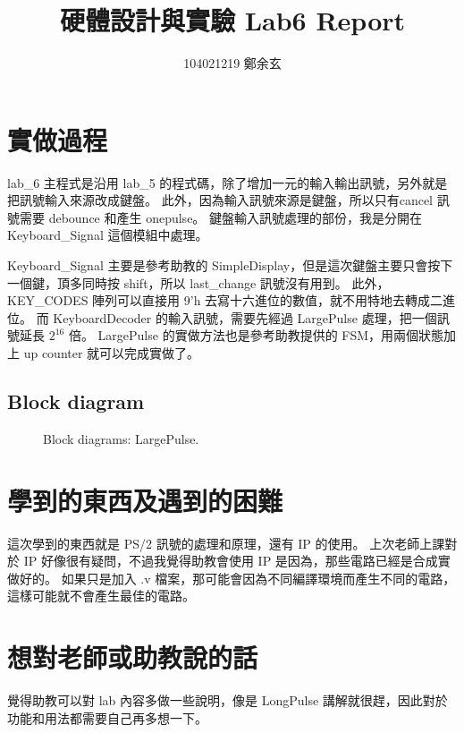 \documentclass{article}
\begin{document}
\begin{CJK}{UTF8}{bsmi}
\title{硬體設計與實驗 Lab6 Report}
\author{104021219 鄭余玄}
\date{}
\maketitle
\section{實做過程}
lab\_6 主程式是沿用 lab\_5 的程式碼，除了增加一元的輸入輸出訊號，另外就是把訊號輸入來源改成鍵盤。
此外，因為輸入訊號來源是鍵盤，所以只有cancel 訊號需要 debounce 和產生 onepulse。
鍵盤輸入訊號處理的部份，我是分開在 Keyboard\_Signal 這個模組中處理。

Keyboard\_Signal 主要是參考助教的 SimpleDisplay，但是這次鍵盤主要只會按下一個鍵，頂多同時按 shift，所以 last\_change 訊號沒有用到。
此外，KEY\_CODES 陣列可以直接用 9'h 去寫十六進位的數值，就不用特地去轉成二進位。
而 KeyboardDecoder 的輸入訊號，需要先經過 LargePulse 處理，把一個訊號延長 $2^{16}$ 倍。
LargePulse 的實做方法也是參考助教提供的 FSM，用兩個狀態加上 up counter 就可以完成實做了。

\subsection{Block diagram}
\begin{figure}[h]
\caption{Block diagrams: LargePulse.}
\end{figure}

\section{學到的東西及遇到的困難}
這次學到的東西就是 PS/2 訊號的處理和原理，還有 IP 的使用。
上次老師上課對於 IP 好像很有疑問，不過我覺得助教會使用 IP 是因為，那些電路已經是合成實做好的。
如果只是加入 .v 檔案，那可能會因為不同編譯環境而產生不同的電路，這樣可能就不會產生最佳的電路。

\section{想對老師或助教說的話}
覺得助教可以對 lab 內容多做一些說明，像是 LongPulse 講解就很趕，因此對於功能和用法都需要自己再多想一下。

\end{CJK}
\end{document}
